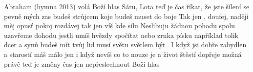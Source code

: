 \begin{TEXT}{Abraham (hymna 2013)}
\SLOKA {} volá Boží hlas\NL
{} Sáru, Lota teď je čas\NL
{} říkat, že jste šílení\NL
{} se pevně mých zas\NL
{} budeš strůjcem koje\NL
{} budeš muset do boje
\REFREN  Tak jen , doufej, naději měj\NL
{} opus\v{t} pokoj rozdávej\NL
tak jen  víš kde sílu 
\SLOKA Neslibuju žádnou pohodu\NL
spolu uzavřeme dohodu\NL
jestli umíš hvězdy spočítat\NL
nebo zrnka písku například\NL
tolik dcer a synů budeš mít\NL
tvůj lid musí světu světlem být
\REFREN \,
\SLOKA I když jsi dobře zabydlen\NL
a starostí máš málo jen\NL
i když nevíš co to nouze je\NL
a život štěstí dopřeje\NL
možná právě te\v{d} je změny čas\NL
jen nepřeslechnout Boží hlas
\REFREN \,
\end{TEXT}
